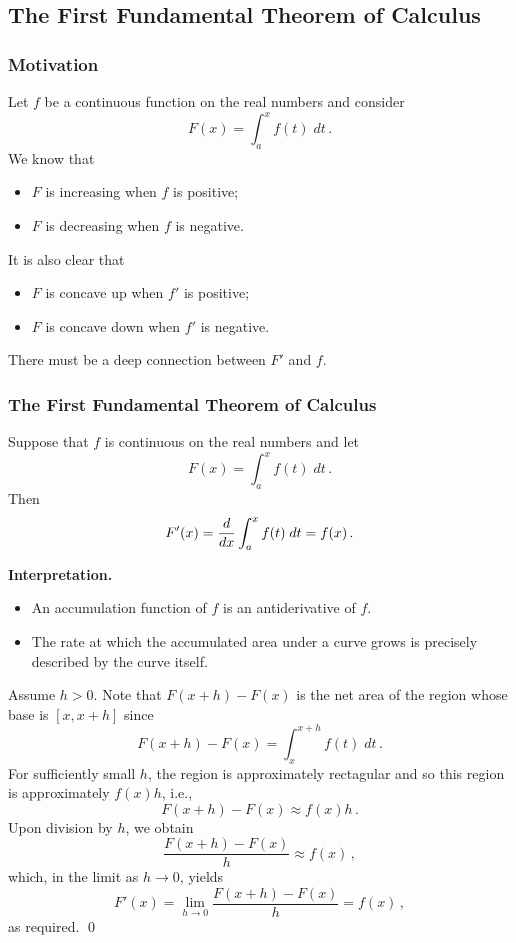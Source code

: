 \documentclass[10pt,t,handout,ignorenonframetext,aspectratio=169]{beamer}
\begin{document}
\subsection{The First Fundamental Theorem of Calculus}

\begin{frame}
  \frametitle{Motivation}
  Let $f$ be a continuous function on the real numbers and consider
  \[
    F(x)= \int_a^x f(t)\; dt \,.
  \]
  We know that
  \begin{itemize}
  \item $F$ is increasing when $f$ is positive;
  \item $F$ is decreasing when $f$ is negative.
  \end{itemize}

  It is also clear that
  \begin{itemize}
  \item $F$ is concave up when $f'$ is positive;
  \item $F$ is concave down when $f'$ is negative.
  \end{itemize}

  There must be a deep connection between $F'$ and $f$.
\end{frame}

\begin{frame}
  \frametitle{The First Fundamental Theorem of Calculus}
  \begin{thm}
    Suppose that $f$ is continuous on the real numbers and let
    \[
      F(x) = \int_a^x f(t) \; dt \,.
    \]
    Then
    \[
      F'(x) = \frac{d}{\mathop{}\!d x} \int_a^x f(t) \; dt = f(x) \,.
    \]
  \end{thm}

  \textbf{Interpretation.}
  \begin{itemize}
  \item An accumulation function of $f$ is an antiderivative of $f$.
  \item The rate at which the accumulated area under a curve grows is precisely described by the curve itself.
  \end{itemize}
\end{frame}

\begin{frame}
  \vs
  Assume $h>0$. Note that $F(x+h) - F(x)$ is the net area of the region whose base
  is $[x, x+h]$ since
  \[
    F(x+h) - F(x) = \int_x^{x+h} f(t) \; dt \,.
  \]
  For sufficiently small $h$, the region is approximately rectagular
  and so this region is approximately $f(x) h$, i.e.,
  \[
    F(x+h) - F(x) \approx f(x) h \,.
  \]
  Upon division by $h$, we obtain
  \[
    \frac{F(x+h) - F(x)}{h} \approx f(x) \,,
  \]
  which, in the limit as $h \to 0$, yields
  \[
    F'(x) = \lim_{h\to0} \frac{F(x+h) - F(x)}{h} = f(x) \,,
  \]
  as required. \qed{}
\end{frame}
\end{document}
